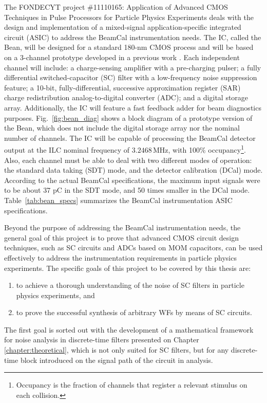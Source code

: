 The FONDECYT project \#11110165: Application of Advanced CMOS Techniques in Pulse Processors for Particle Physics Experiments deals with the design and implementation of a mixed-signal application-specific integrated circuit (ASIC) to address the BeamCal instrumentation needs. The IC, called the Bean, will be designed for a standard 180-nm CMOS process and will be based on a 3-channel prototype developed in a previous work \citep{abusleme101}. Each independent channel will include: a charge-sensing amplifier with a pre-charging pulser; a fully differential switched-capacitor (SC) filter with a low-frequency noise suppression feature; a 10-bit, fully-differential, successive approximation register (SAR) charge redistribution analog-to-digital converter (ADC); and a digital storage array. Additionally, the IC will feature a fast feedback adder for beam diagnostics purposes. Fig.~\ref{fig:bean_diag} shows a block diagram of a prototype version of the Bean, which does not include the digital storage array nor the nominal number of channels. The IC will be capable of processing the BeamCal detector output at the ILC nominal frequency of $3.2468\,\text{MHz}$, with 100\% occupancy\footnote{Occupancy is the fraction of channels that register a relevant stimulus on each collision.}. Also, each channel must be able to deal with  two different modes of operation: the standard data taking (SDT) mode, and the detector calibration (DCal) mode. According to the actual BeamCal specifications, the maximum input signals were to be about 37 pC in the SDT mode, and 50 times smaller in the DCal mode. Table~\ref{tab:bean_specs} summarizes the BeamCal instrumentation ASIC specifications. 

Beyond the purpose of addressing the BeamCal instrumentation needs, the general goal of this project is to prove that advanced CMOS circuit design techniques, such as SC circuits and ADCs based on MOM capacitors, can be used effectively to address the instrumentation requirements in particle physics experiments. 
The specific goals of this project to be covered by this thesis are:
\begin{enumerate}
\item  to achieve a thorough understanding of the noise of SC filters in particle physics experiments, and
\item  to prove the successful synthesis of arbitrary WFs by means of SC circuits.
\end{enumerate}

The first goal is sorted out with the development of a mathematical framework for noise analysis in discrete-time filters presented on Chapter \ref{chapter:theoretical}, which is not only suited for SC filters, but for any discrete-time block introduced on the signal path of the circuit in analysis.

